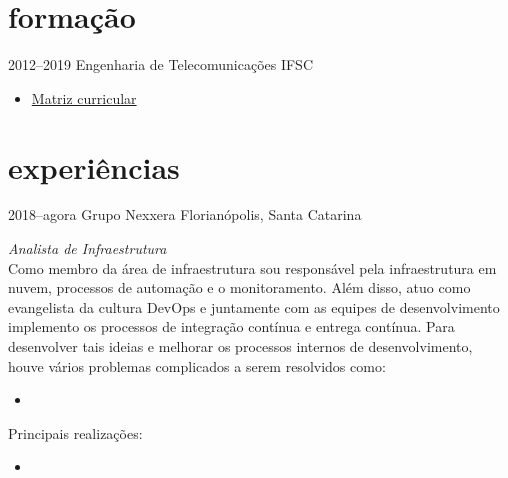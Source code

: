\documentclass[]{friggeri-cv} %
\begin{document}

\section{formação}

\begin{entrylist}
\entry
{2012--2019}
{Engenharia de Telecomunicações}
{IFSC}
{
    \begin{itemize}
        \item \href{https://www.sj.ifsc.edu.br/index.php/campus/boletins-informativos/198-engenharia-de-telecomunicacoes-m
atriz-curricular}{Matriz curricular}
    \end{itemize}
}
\end{entrylist}


\section{experiências}

\begin{entrylist}
\entry
{2018--agora}
{Grupo Nexxera}
{Florianópolis, Santa Catarina}
{\emph{Analista de Infraestrutura} \\

    Como membro da área de infraestrutura sou responsável pela infraestrutura em nuvem,
    processos de automação e o monitoramento. Além disso, atuo como evangelista da cultura DevOps e juntamente com as equipes de desenvolvimento implemento os processos de integração contínua e entrega contínua. Para desenvolver tais ideias e melhorar os processos internos de desenvolvimento, houve vários problemas complicados a serem resolvidos como:

\begin{itemize}
    \item 
\end{itemize}

Principais realizações:\\

\begin{itemize}
    \item 
\end{itemize}

}
\end{entrylist}
\end{document}
